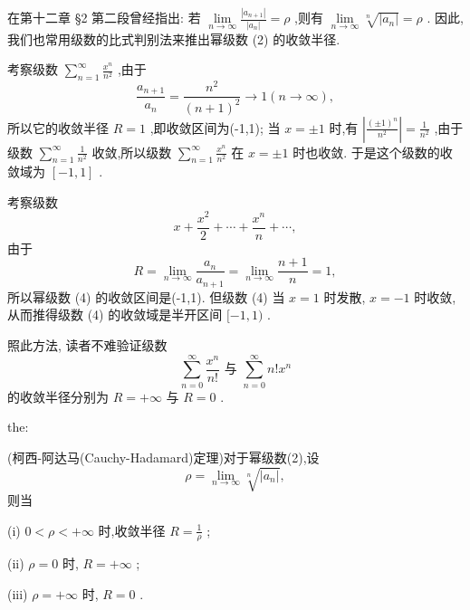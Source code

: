 在第十二章 §2 第二段曾经指出: 若 \(\mathop{\lim }\limits_{{n \rightarrow  \infty }}\frac{\left| {a}_{n + 1}\right| }{\left| {a}_{n}\right| } = \rho\) ,则有 \(\mathop{\lim }\limits_{{n \rightarrow  \infty }}\sqrt[n]{\left| {a}_{n}\right| } = \rho\) . 因此,我们也常用级数的比式判别法来推出幂级数 (2) 的收敛半径.

\begin{example}

\end{example}
考察级数 \(\mathop{\sum }\limits_{{n = 1}}^{\infty }\frac{{x}^{n}}{{n}^{2}}\) ,由于
\[
\frac{{a}_{n + 1}}{{a}_{n}} = \frac{{n}^{2}}{{\left( n + 1\right) }^{2}} \rightarrow  1\left( {n \rightarrow  \infty }\right) ,
\]
所以它的收敛半径 \(R = 1\) ,即收敛区间为(-1,1); 当 \(x =  \pm  1\) 时,有 \(\left| \frac{{\left( \pm 1\right) }^{n}}{{n}^{2}}\right|  = \frac{1}{{n}^{2}}\) ,由于级数 \(\mathop{\sum }\limits_{{n = 1}}^{\infty }\frac{1}{{n}^{2}}\) 收敛,所以级数 \(\mathop{\sum }\limits_{{n = 1}}^{\infty }\frac{{x}^{n}}{{n}^{2}}\) 在 \(x =  \pm  1\) 时也收敛. 于是这个级数的收敛域为 \(\left\lbrack  {-1,1}\right\rbrack\) .

\begin{example}

\end{example}
考察级数
\[
x + \frac{{x}^{2}}{2} + \cdots  + \frac{{x}^{n}}{n} + \cdots , \tag{4}
\]
由于
\[
R = \mathop{\lim }\limits_{{n \rightarrow  \infty }}\frac{{a}_{n}}{{a}_{n + 1}} = \mathop{\lim }\limits_{{n \rightarrow  \infty }}\frac{n + 1}{n} = 1,
\]
所以幂级数 (4) 的收敛区间是(-1,1). 但级数 (4) 当 \(x = 1\) 时发散, \(x =  - 1\) 时收敛,从而推得级数 (4) 的收敛域是半开区间 \(\lbrack  - 1,1)\) .

照此方法, 读者不难验证级数
\[
\mathop{\sum }\limits_{{n = 0}}^{\infty }\frac{{x}^{n}}{n!}\text{ 与 }\mathop{\sum }\limits_{{n = 0}}^{\infty }n!{x}^{n}
\]
的收敛半径分别为 \(R =  + \infty\) 与 \(R = 0\) .

\begin{theorem}{}{the:}

\end{theorem}
(柯西-阿达马(Cauchy-Hadamard)定理)对于幂级数(2),设
\[
\rho  = \mathop{\lim }\limits_{{n \rightarrow  \infty }}\sqrt[n]{\left| {a}_{n}\right| }, \tag{5}
\]
则当

(i) \(0 < \rho  <  + \infty\) 时,收敛半径 \(R = \frac{1}{\rho }\) ;

(ii) \(\rho  = 0\) 时, \(R =  + \infty\) ;

(iii) \(\rho  =  + \infty\) 时, \(R = 0\) .

